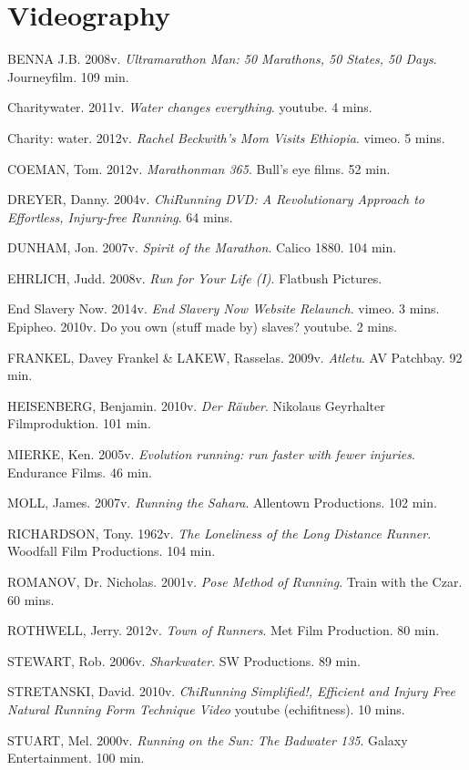 
% 




\section*{Videography}


\bibitem{} BENNA J.B. 2008v. \textit{Ultramarathon Man: 50 Marathons, 50 States, 50 Days}. Journeyfilm.
109 min.

\bibitem{} Charitywater. 2011v. \textit{Water changes everything}. youtube. 4 mins.

\bibitem{} Charity: water. 2012v. \textit{Rachel Beckwith’s Mom Visits Ethiopia}. vimeo. 5 mins.

\bibitem{} COEMAN, Tom. 2012v. \textit{Marathonman 365}. Bull’s eye films. 52 min.

\bibitem{} DREYER, Danny. 2004v. \textit{ChiRunning DVD: A Revolutionary Approach to Effortless, Injury-free Running}. 64 mins.

\bibitem{} DUNHAM, Jon. 2007v. \textit{Spirit of the Marathon}. Calico 1880. 104 min.

\bibitem{} EHRLICH, Judd. 2008v. \textit{Run for Your Life (I)}. Flatbush Pictures.

\bibitem{} End Slavery Now. 2014v. \textit{End Slavery Now Website Relaunch}. vimeo. 3 mins.
Epipheo. 2010v. Do you own (stuff made by) slaves? youtube. 2 mins.

\bibitem{} FRANKEL, Davey Frankel & LAKEW, Rasselas. 2009v. \textit{Atletu}. AV Patchbay. 92 min.

\bibitem{} HEISENBERG, Benjamin. 2010v. \textit{Der Räuber}. Nikolaus Geyrhalter Filmproduktion. 101 min.

\bibitem{} MIERKE, Ken. 2005v. \textit{Evolution running: run faster with fewer injuries}. Endurance Films. 46 min.

\bibitem{} MOLL, James. 2007v. \textit{Running the Sahara}. Allentown Productions. 102 min.

\bibitem{} RICHARDSON, Tony. 1962v. \textit{The Loneliness of the Long Distance Runner}. Woodfall
Film Productions. 104 min.

\bibitem{} ROMANOV, Dr. Nicholas. 2001v. \textit{Pose Method of Running}. Train with the Czar. 60 mins.

\bibitem{} ROTHWELL, Jerry. 2012v. \textit{Town of Runners}. Met Film Production. 80 min.

\bibitem{} STEWART, Rob. 2006v. \textit{Sharkwater}. SW Productions. 89 min.

\bibitem{} STRETANSKI, David. 2010v. \textit{ChiRunning Simplified!, Efficient and Injury Free Natural Running Form Technique Video} youtube (echifitness). 10 mins.

\bibitem{} STUART, Mel. 2000v. \textit{Running on the Sun: The Badwater 135}. Galaxy Entertainment.
100 min.
